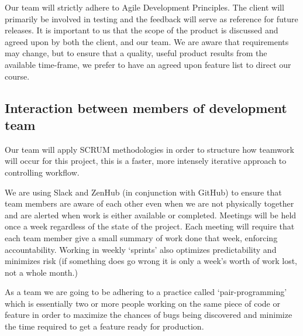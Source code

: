 \documentclass[12pt,a4paper]{article}
\begin{document}
   Our team will strictly adhere to Agile Development Principles. The client will primarily be involved in testing and the feedback will serve as reference for future releases. It is important to us that the scope of the product
   is discussed and agreed upon by both the client, and our team. We are aware that requirements may change, but to ensure that a quality, useful product results from the available time-frame, we prefer to have an agreed upon
   feature list to direct our course.

   \subsection{Interaction between members of development team}
   Our team will apply SCRUM methodologies in order to structure how teamwork will occur for this project, this is a faster, more intensely iterative approach to controlling workflow.

   We are using Slack and ZenHub (in conjunction with GitHub) to ensure that team members are aware of each other even when we are not physically together and are alerted when work is either available or completed.
	Meetings will be held once a week regardless of the state of the project. Each meeting will require that each team member give a small summary of work done that week, enforcing accountability.
   Working in weekly `sprints' also optimizes predictability and minimizes risk (if something does go wrong it is only a week's worth of work lost, not a whole month.)

   As a team we are going to be adhering to a practice called `pair-programming' which is essentially two or more people working on the same piece of code or feature in order to maximize the chances of bugs
   being discovered and minimize the time required to get a feature ready for production.

   \newpage
\end{document}
